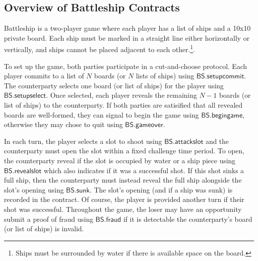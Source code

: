 \documentclass{llncs}
\newcommand{\battleshipfraud}{\mathsf{BS.fraud}}
\newcommand{\battleshipattackslot}{\mathsf{BS.attackslot}}
\newcommand{\battleshipbegin}{\mathsf{BS.begingame}}
\newcommand{\battleshipcommit}{\mathsf{BS.setupcommit}}
\newcommand{\battleshipselectboard}{\mathsf{BS.setupselect}}
\newcommand{\battleshiprevealslot}{\mathsf{BS.revealslot}}
\newcommand{\battleshipsinking}{\mathsf{BS.sunk}}
\newcommand{\battleshipgameover}{\mathsf{BS.gameover}}
\begin{document}
\subsection{Overview of Battleship Contracts}

Battleship is a two-player game where each player has a list of ships and a 10x10 private board. 
Each ship must be marked in a straight line either horizontally or vertically, and ships cannot be placed adjacent to each other.\footnote{Ships must be surrounded by water if there is available space on the board.}.

To set up the game, both parties participate in a cut-and-choose protocol.
Each player commits to a list of $N$ boards (or $N$ lists of ships) using $\battleshipcommit$. 
The counterparty selects one board (or list of ships) for the player using $\battleshipselectboard$.
Once selected, each player reveals the remaining $N-1$ boards (or list of ships) to the counterparty. 
If both parties are satisified that all revealed boards are well-formed, they can signal to begin the game using $\battleshipbegin$, otherwise they may chose to quit using $\battleshipgameover$. 

In each turn, the player selects a slot to shoot using $\battleshipattackslot$ and the counterparty must open the slot  within a fixed challenge time period. 
To open, the counterparty reveal if the slot is occupied by water or a ship piece using $\battleshiprevealslot$ which also indicates if it was a successful shot. 
If this shot sinks a full ship, then the counterparty must instead reveal the full ship alongside the slot's opening using $\battleshipsinking$. 
The slot's opening (and if a ship was sunk) is recorded in the contract. 
Of course, the player is provided another turn if their shot was successful.
Throughout the game, the loser may have an opportunity submit a proof of fraud using $\battleshipfraud$ if it is detectable the counterparty's board (or list of ships) is invalid. 
\end{document}

